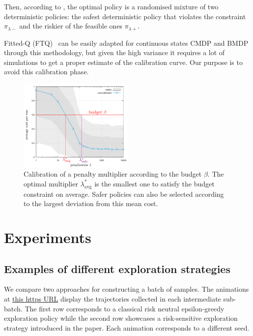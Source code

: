 Then, according to \citet[Theorem 4.4]{BEUTLER1985236}, the optimal policy is a randomised mixture of two deterministic policies: the safest deterministic policy that violates the constraint $\pi_{\lambda-}$ and the riskier of the feasible ones $\pi_{\lambda+}$.

Fitted-Q (FTQ)~\citep{Ernst2005,Riedmiller2005} can be easily adapted for continuous states CMDP and BMDP through this methodology, but given the high variance it requires a lot of simulations to get a proper estimate of the calibration curve. Our purpose is to avoid this calibration phase.

\begin{figure}[tp]
    \centering
    \includegraphics[width=0.5\textwidth]{2-Chapters/5-Chapter/img/CalibrationExample}
    \caption{Calibration of a penalty multiplier according to the budget $\beta$. The optimal multiplier $\lambda^*_{\text{avg}}$ is the smallest one to satisfy the budget constraint on average. Safer policies can also be selected according to the largest deviation from this mean cost.}
    \label{fig:Lagrangian}
\end{figure}


\section{Experiments}
\label{sec:exp-supp}


\subsection{Examples of different exploration strategies}
\label{subsec:exploration-examples}
We compare two approaches for constructing a batch of samples. The animations at  \href{https://budgeted-rl.github.io/\#risk-sensitive-exploration}{this https URL} display the trajectories collected in each intermediate sub-batch. The first row corresponds to a classical  risk neutral epsilon-greedy exploration policy while the second row showcases a risk-sensitive exploration strategy introduced in the paper. Each animation corresponds to a different seed.

